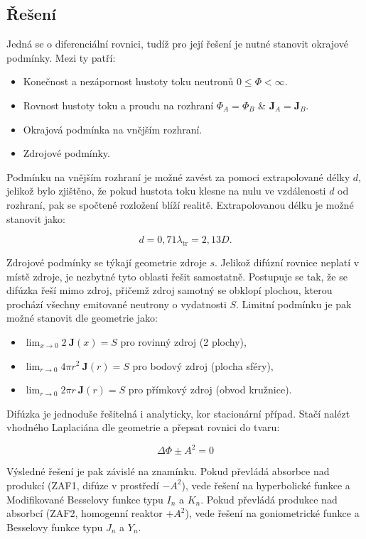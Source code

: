 \subsection{Řešení}

Jedná se o diferenciální rovnici, tudíž pro její řešení je nutné stanovit okrajové podmínky. Mezi ty patří:

\begin{itemize}
    \item Konečnost a nezápornost hustoty toku neutronů $0 \leq \Phi < \infty $.
    \item Rovnost hustoty toku a proudu na rozhraní $\Phi_A = \Phi_B$ \& $\textbf{J}_A = \textbf{J}_B$.
    \item Okrajová podmínka na vnějším rozhraní.
    \item Zdrojové podmínky.
\end{itemize}

Podmínku na vnějším rozhraní je možné zavést za pomoci extrapolované délky $d$, jelikož bylo zjištěno, že pokud hustota toku klesne na nulu ve vzdálenosti $d$ od rozhraní, pak se spočtené rozložení blíží realitě. Extrapolovanou délku je možné stanovit jako:

$$ d = 0,71 \lambda_\text{tr} = 2,13 D. $$

Zdrojové podmínky se týkají geometrie zdroje $s$. Jelikož difúzní rovnice neplatí v místě zdroje, je nezbytné tyto oblasti řešit samostatně. Postupuje se tak, že se difúzka řeší mimo zdroj, přičemž zdroj samotný se obklopí plochou, kterou prochází všechny emitované neutrony o vydatnosti $S$. Limitní podmínku je pak možné stanovit dle geometrie jako:

\begin{itemize}
    \item $ \lim_{x \to 0} 2 \: \textbf{J}(x) = S $ pro rovinný zdroj (2 plochy),
    \item $ \lim_{r \to 0} 4 \pi r^2 \: \textbf{J}(r) = S $ pro bodový zdroj (plocha sféry),
    \item $ \lim_{r \to 0} 2 \pi r \: \textbf{J}(r) = S $ pro přímkový zdroj (obvod kružnice).
\end{itemize}

Difúzka je jednoduše řešitelná i analyticky, kor stacionární případ. Stačí nalézt vhodného Laplaciána dle geometrie a přepsat rovnici do tvaru:

$$ \Delta \Phi \pm A^2 = 0 $$

Výsledné řešení je pak závislé na znamínku. Pokud převládá absorbce nad produkcí (ZAF1, difúze v prostředí $ - A^2$), vede řešení na hyperbolické funkce a Modifikované Besselovy funkce typu $I_n$ a $K_n$. Pokud převládá produkce nad absorbcí (ZAF2, homogenní reaktor $ + A^2$), vede řešení na goniometrické funkce a Besselovy funkce typu $J_n$ a $Y_n$.

